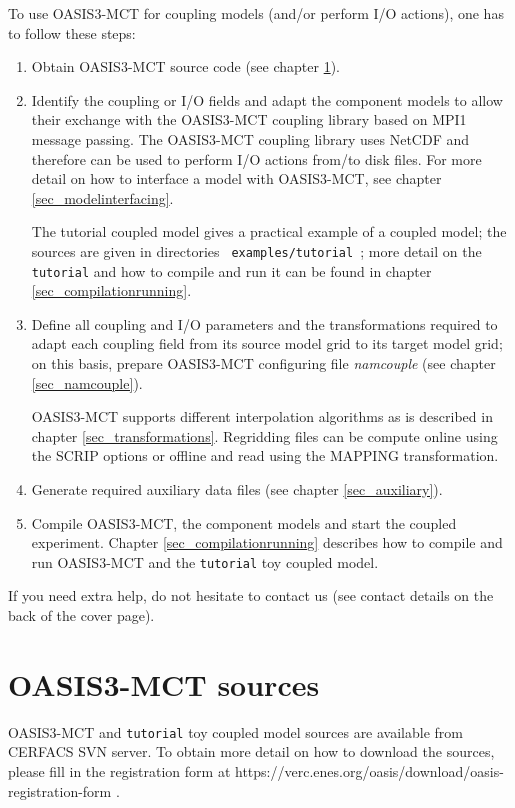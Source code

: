 To use OASIS3-MCT for coupling models (and/or perform I/O
actions), one has to follow these steps:
\begin{enumerate}
\item Obtain OASIS3-MCT source code (see chapter \ref{sec_Obtaining}).
\item Identify the coupling or I/O fields and adapt the component
  models to allow their exchange with the OASIS3-MCT coupling library based on MPI1
  message passing.
  The OASIS3-MCT coupling library uses NetCDF and therefore can be used to perform I/O actions
  from/to disk files.  For more detail on how to interface a model
  with OASIS3-MCT, see chapter \ref{sec_modelinterfacing}.

The tutorial coupled model gives a practical example of a coupled
model; the sources are given in directories {\tt
  examples/tutorial }; more detail on the {\tt tutorial} and
how to compile and run it can be found in chapter
\ref{sec_compilationrunning}.

\item Define all coupling and I/O parameters and the transformations
  required to adapt each coupling field from its source model grid to
  its target model grid; on this basis, prepare OASIS3-MCT configuring file 
  {\it namcouple} (see chapter \ref{sec_namcouple}). 
  
  OASIS3-MCT supports different interpolation algorithms as is described in
  chapter \ref{sec_transformations}.  Regridding files can be compute
  online using the SCRIP options or offline and read using the MAPPING
  transformation.

\item Generate required auxiliary data files (see chapter
  \ref{sec_auxiliary}).
\item Compile OASIS3-MCT, the component models and start the coupled
  experiment. Chapter \ref{sec_compilationrunning} describes how to
  compile and run OASIS3-MCT and the {\tt tutorial} toy coupled model.

\end{enumerate}

If you need extra help, do not hesitate to contact us (see contact
details on the back of the cover page).

\section{OASIS3-MCT sources}
\label{sec_Obtaining}
OASIS3-MCT and {\tt tutorial} toy coupled model sources are available from CERFACS SVN server. To obtain more detail on how to download
the sources, please fill in the registration form at \newline 
https://verc.enes.org/oasis/download/oasis-registration-form .

